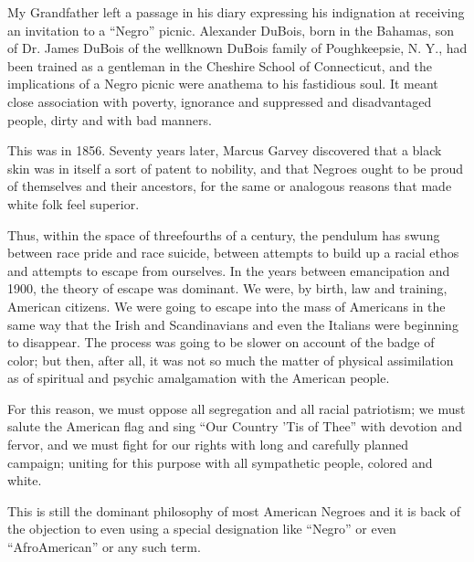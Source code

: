 \documentclass[letterpaper,10pt,english]{jupyterBook}
\begin{document}
\sphinxAtStartPar
My Grandfather left a passage in his diary expressing his indignation at receiving an invitation to a “Negro” picnic. Alexander DuBois, born in the Bahamas, son of Dr. James DuBois of the well\sphinxhyphen{}known DuBois family of Poughkeepsie, N. Y., had been trained as a gentleman in the Cheshire School of Connecticut, and the implications of a Negro picnic were anathema to his fastidious soul. It meant close association with poverty, ignorance and suppressed and disadvantaged people, dirty and with bad manners.

\sphinxAtStartPar
This was in 1856. Seventy years later, Marcus Garvey discovered that a black skin was in itself a sort of patent to nobility, and that Negroes ought to be proud of themselves and their ancestors, for the same or analogous reasons that made white folk feel superior.

\sphinxAtStartPar
Thus, within the space of three\sphinxhyphen{}fourths of a century, the pendulum has swung between race pride and race suicide, between attempts to build up a racial ethos and attempts to escape from ourselves. In the years between emancipation and 1900, the theory of escape was dominant. We were, by birth, law and training, American citizens. We were going to escape into the mass of Americans in the same way that the Irish and Scandinavians and even the Italians were beginning to disappear. The process was going to be slower on account of the badge of color; but then, after all, it was not so much the matter of physical assimilation as of spiritual and psychic amalgamation with the American people.

\sphinxAtStartPar
For this reason, we must oppose all segregation and all racial patriotism; we must salute the American flag and sing “Our Country ’Tis of Thee” with devotion and fervor, and we must fight for our rights with long and carefully planned campaign; uniting for this purpose with all sympathetic people, colored and white.

\sphinxAtStartPar
This is still the dominant philosophy of most American Negroes and it is back of the objection to even using a special designation like “Negro” or even “Afro\sphinxhyphen{}American” or any such term.
\end{document}
